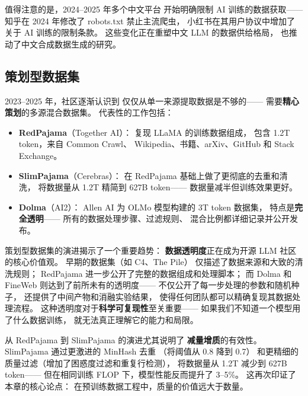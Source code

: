 值得注意的是，2024--2025 年多个中文平台
开始明确限制 AI 训练的数据获取——
知乎在 2024 年修改了 robots.txt 禁止主流爬虫，
小红书在其用户协议中增加了关于 AI 训练的限制条款。
这些变化正在重塑中文 LLM 的数据供给格局，
也推动了中文合成数据生成的研究。

\subsection{策划型数据集}

2023--2025 年，社区逐渐认识到
仅仅从单一来源提取数据是不够的——
需要\textbf{精心策划}的多源混合数据集。
代表性的工作包括：

\begin{itemize}[noitemsep]
  \item \textbf{RedPajama}（Together AI）：
        复现 LLaMA 的训练数据组成，
        包含 1.2T token，来自 Common Crawl、
        Wikipedia、书籍、arXiv、GitHub 和
        Stack Exchange。
  \item \textbf{SlimPajama}（Cerebras）：
        在 RedPajama 基础上做了更彻底的去重和清洗，
        将数据量从 1.2T 精简到 627B token——
        数据量减半但训练效果更好。
  \item \textbf{Dolma}（AI2）：
        Allen AI 为 OLMo 模型构建的 3T token 数据集，
        特点是\textbf{完全透明}——
        所有的数据处理步骤、过滤规则、
        混合比例都详细记录并公开发布。
\end{itemize}

策划型数据集的演进揭示了一个重要趋势：
\textbf{数据透明度}正在成为开源 LLM 社区的核心价值观。
早期的数据集（如 C4、The Pile）
仅描述了数据来源和大致的清洗规则；
RedPajama 进一步公开了完整的数据组成和处理脚本；
而 Dolma 和 FineWeb 则达到了前所未有的透明度——
不仅公开了每一步处理的参数和随机种子，
还提供了中间产物和消融实验结果，
使得任何团队都可以精确复现其数据处理流程。
这种透明度对于\textbf{科学可复现性}至关重要——
如果我们不知道一个模型用了什么数据训练，
就无法真正理解它的能力和局限。

从 RedPajama 到 SlimPajama 的演进尤其说明了
\textbf{减量增质}的有效性。
SlimPajama 通过更激进的 MinHash 去重
（将阈值从 0.8 降到 0.7）
和更精细的质量过滤（增加了困惑度过滤和重复行检测），
将数据量从 1.2T 减少到 627B token——
但在相同训练 FLOP 下，模型性能反而提升了 3--5\%。
这再次印证了本章的核心论点：
在预训练数据工程中，质量的价值远大于数量。


